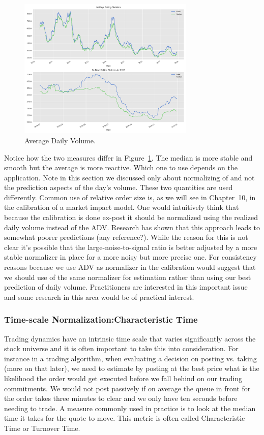 	\begin{figure}[!ht]
		\centering
			\includegraphics[width=0.75\textwidth]{chapters/chapter_trade_data_models/figures/adv.png} 
		\caption{Average Daily Volume.\label{fig:adv}}
	\end{figure}
Notice how the two measures differ in Figure~\ref{fig:adv}. The median is more stable and smooth but the average is more reactive. Which one to use depends on the application. Note in this section we discussed only about normalizing of and not the prediction aspects of the day's volume. These two quantities are used differently. Common use of relative order size is, as we will see in Chapter~10, in the calibration of a market impact model. One would intuitively think that because the calibration is done ex-post it should be normalized using the realized daily volume instead of the ADV. Research has shown that this approach leads to somewhat poorer predictions (any reference?). While the reason for this is not clear it's possible that the large-noise-to-signal ratio is better adjusted by a more stable normalizer in place for a more noisy but more precise one. For consistency reasons because we use ADV as normalizer in the calibration would suggest that we should use of the same normalizer for estimation rather than using our best prediction of daily volume. Practitioners are interested in this important issue and some research in this area would be of practical interest. 


\subsubsection{Time-scale Normalization:Characteristic Time}

Trading dynamics have an intrinsic time scale that varies significantly across the stock universe and it is often important to take this into consideration. For instance in a trading algorithm, when evaluating a decision on posting vs. taking (more on that later), we need to estimate by posting at the best price what is the likelihood the order would get executed before we fall behind on our trading commitments. We would not post passively if on average the queue in front for the order takes three minutes to clear and we only have ten seconds before needing to trade. A measure commonly used in practice is to look at the median time it takes for the quote to move. This metric is often called Characteristic Time or Turnover Time. 


